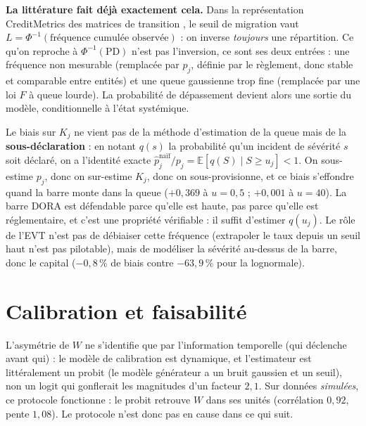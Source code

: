 \begin{cle}
\textbf{La littérature fait déjà exactement cela.} Dans la représentation CreditMetrics des
matrices de transition \citep{jpmorgan1997}, le seuil de migration vaut
$L=\Phi^{-1}(\text{fréquence cumulée observée})$ : on inverse \emph{toujours} une répartition. Ce
qu'on reproche à $\Phi^{-1}(\mathrm{PD})$ n'est pas l'inversion, ce sont ses deux entrées : une
fréquence non mesurable (remplacée par $p_j$, définie par le règlement, donc stable et
comparable entre entités) et une queue gaussienne trop fine (remplacée par une loi $F$ à queue
lourde). La probabilité de dépassement devient alors une sortie du modèle,
conditionnelle à l'état systémique.
\end{cle}

\noindent Le biais sur $K_j$ ne vient pas de la méthode d'estimation de la queue mais de la
\textbf{sous-déclaration} : en notant $q(s)$ la probabilité qu'un incident de sévérité $s$ soit
déclaré, on a l'identité exacte $\hat p_j^{\text{naïf}}/p_j=\mathbb E[q(S)\mid S\ge u_j]<1$. On
sous-estime $p_j$, donc on sur-estime $K_j$, donc on sous-provisionne, et ce biais s'effondre
quand la barre monte dans la queue ($+0{,}369$ à $u=0{,}5$ ; $+0{,}001$ à $u=40$). La
barre DORA est défendable parce qu'elle est haute, pas parce qu'elle est réglementaire, et
c'est une propriété vérifiable : il suffit d'estimer $q(u_j)$. Le rôle de l'EVT n'est pas de
débiaiser cette fréquence (extrapoler le taux depuis un seuil haut n'est pas pilotable), mais de
modéliser la sévérité au-dessus de la barre, donc le capital ($-0{,}8\,\%$ de biais
contre $-63{,}9\,\%$ pour la lognormale).


\section{Calibration et faisabilité}
\label{sec:calib-cascade}

L'asymétrie de $W$ ne s'identifie que par l'information temporelle (qui déclenche avant
qui) : le modèle de calibration est dynamique, et l'estimateur est littéralement un
probit (le modèle générateur a un bruit gaussien et un seuil), non un logit qui gonflerait les
magnitudes d'un facteur $2{,}1$. Sur données \emph{simulées}, ce protocole fonctionne : le probit
retrouve $W$ dans ses unités (corrélation $0{,}92$, pente $1{,}08$). Le protocole n'est donc pas
en cause dans ce qui suit.

